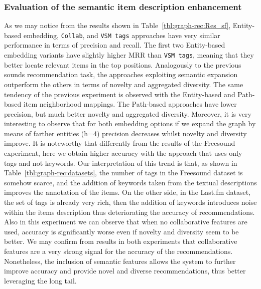 \subsubsection{Evaluation of the semantic item description enhancement}\label{sem_eval}
As we may notice from the results shown in Table~\ref{tbl:graph-rec:Res_sf}, Entity-based embedding, \texttt{Collab}, and \texttt{VSM tags} approaches have very similar performance in terms of precision and recall. The first two Entity-based embedding variants have slightly higher MRR than \texttt{VSM tags}, meaning that they better locate relevant items in the top positions. Analogously to the previous sounds recommendation task, the approaches exploiting semantic expansion outperform the others in terms of novelty and aggregated diversity. The same tendency of the previous experiment is observed with the Entity-based and Path-based item neighborhood mappings. The Path-based approaches have lower precision, but much better novelty and aggregated diversity. Moreover, it is very interesting to observe that for both embedding options if we expand the graph by means of farther entities (h=4) precision decreases whilst novelty and diversity improve. It is noteworthy that differently from the results of the Freesound experiment, here we obtain higher accuracy with the approach that uses only tags and not keywords. Our interpretation of this trend is that, as shown in Table~\ref{tbl:graph-rec:datasets}, the number of tags in the Freesound dataset is somehow scarce, and the addition of keywords taken from the textual descriptions improves the annotation of the items. On the other side, in the Last.fm dataset, the set of tags is already very rich, then the addition of keywords introduces noise within the items description thus deteriorating the accuracy of recommendations. 
Also in this experiment we can observe that when no collaborative features are used, accuracy is significantly worse even if novelty and diversity seem to be better. 
We may confirm from results in both experiments that collaborative features are a very strong signal for the accuracy of the recommendations. Nonetheless, the inclusion of semantic features allows the system to further improve accuracy and provide novel and diverse recommendations, thus better leveraging the long tail. %
